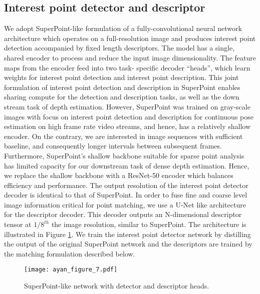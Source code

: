 \documentclass[runningheads]{llncs}
\begin{document}
\subsection{Interest point detector and descriptor}
We adopt SuperPoint-like \cite{superpoint} formulation of a fully-convolutional neural network architecture which operates on a full-resolution image and produces interest point detection accompanied by fixed length descriptors. The model has a single, shared encoder to process and reduce the input image dimensionality. The feature maps from the encoder feed into two task- specific decoder “heads”, which learn weights for interest point detection and interest point description. This joint formulation of interest point detection and description in SuperPoint enables sharing compute for the detection and description tasks, as well as the down stream task of depth estimation. However, SuperPoint was trained on gray-scale images with focus on interest point detection and description for continuous pose estimation on high frame rate video streams, and hence, has a relatively shallow encoder. On the contrary, we are interested in image sequences with sufficient baseline, and consequently longer intervals between subsequent frames. Furthermore, SuperPoint's shallow backbone suitable for sparse point analysis has limited capacity for our downstream task of dense depth estimation. Hence, we replace the shallow backbone with a ResNet-50 \cite{he2016deep} encoder which balances efficiency and performance. The output resolution of the interest point detector decoder is identical to that of SuperPoint. In order to fuse fine and coarse level image information critical for point matching, we use a U-Net \cite{ronneberger2015u} like architecture for the descriptor decoder. This decoder outputs an N-dimensional descriptor tensor at $1/8^{th}$ the image resolution, similar to SuperPoint. The architecture is illustrated in Figure \ref{figsuperpoint}. We train the interest point detector network by distilling the output of the original SuperPoint network and the descriptors are trained by the matching formulation described below.   


\begin{figure}[t]
\centering
\texttt{[image: ayan\_figure\_7.pdf]}
\caption{ SuperPoint-like network with detector and descriptor heads. } 
\label{figsuperpoint}
\end{figure}
\end{document}
